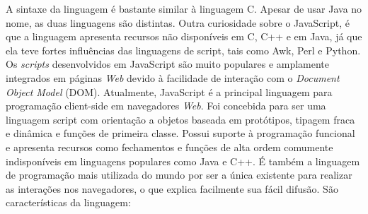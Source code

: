 A sintaxe da linguagem é bastante similar à linguagem C. Apesar de usar Java no nome, as duas linguagens são distintas. Outra curiosidade sobre o JavaScript, é que a linguagem apresenta recursos não disponíveis em C, C++ e em Java, já que ela teve fortes influências das linguagens de script, tais como Awk, Perl e Python. Os \textit{scripts} desenvolvidos em JavaScript são muito populares e amplamente integrados em páginas \textit{Web} devido à facilidade de interação com o \textit{Document Object Model} (DOM). Atualmente, JavaScript é a principal linguagem para programação client-side em navegadores \textit{Web}. Foi concebida para ser uma linguagem script com orientação a objetos baseada em protótipos, tipagem fraca e dinâmica e funções de primeira classe. Possui suporte à programação funcional e apresenta recursos como fechamentos e funções de alta ordem comumente indisponíveis em linguagens populares como Java e C++. É também a linguagem de programação mais utilizada do mundo por ser a única existente para realizar as interações nos navegadores, o que explica facilmente sua fácil difusão. São características da linguagem:
